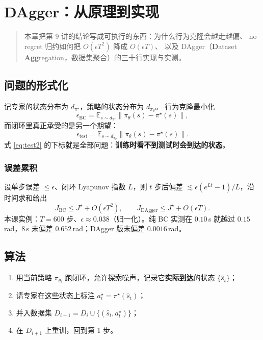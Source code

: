 \chapter{DAgger：从原理到实现}
\label{ch:dagger-impl}

\begin{quote}\small
本章把第 9 讲的结论写成可执行的东西：为什么行为克隆会越走越偏、
no-regret 归约如何把 $O(\epsilon T^2)$ 降成 $O(\epsilon T)$、
以及 DAgger（\textbf{D}ataset \textbf{Agg}regation，数据集聚合）的三十行实现与实测。
\end{quote}

\section{问题的形式化}

记专家的状态分布为 $d_{\pi^\star}$，策略的状态分布为 $d_{\pi_\theta}$。
行为克隆最小化
\begin{equation}
  \epsilon_{\mathrm{BC}}=\mathbb{E}_{s\sim d_{\pi^\star}}
  \big\|\pi_\theta(s)-\pi^\star(s)\big\|,
\end{equation}
而闭环里真正承受的是另一个期望：
\begin{equation}
  \epsilon_{\mathrm{test}}=\mathbb{E}_{s\sim d_{\pi_\theta}}
  \big\|\pi_\theta(s)-\pi^\star(s)\big\|.
  \label{eq:test2}
\end{equation}
式 \eqref{eq:test2} 的下标就是全部问题：\textbf{训练时看不到测试时会到达的状态}。

\subsection{误差累积}

设单步误差 $\le\epsilon$、闭环 Lyapunov 指数 $L$，则 $t$ 步后偏差
$\lesssim\epsilon(e^{Lt}-1)/L$，沿时间求和给出
\begin{equation}
  J_{\mathrm{BC}}\le J^\star+O(\epsilon T^2),
  \qquad
  J_{\mathrm{DAgger}}\le J^\star+O(\epsilon T).
\end{equation}
本课实例：$T=600$ 步、$\epsilon\approx0.038$（归一化）。纯 BC 实测在
$0.10$\,s 就越过 $0.15$\,rad，8\,s 末偏差 $0.652$\,rad；DAgger 版末偏差 $0.0016$\,rad。

\section{算法}

\begin{enumerate}[leftmargin=1.6em,itemsep=3pt]
  \item 用当前策略 $\pi_{\theta_i}$ 跑闭环，允许探索噪声，记录它\textbf{实际到达}的状态 $\{\hat s_t\}$；
  \item 请专家在这些状态上标注 $a^\star_t=\pi^\star(\hat s_t)$；
  \item 并入数据集 $D_{i+1}=D_i\cup\{(\hat s_t,a^\star_t)\}$；
  \item 在 $D_{i+1}$ 上重训，回到第 1 步。
\end{enumerate}

